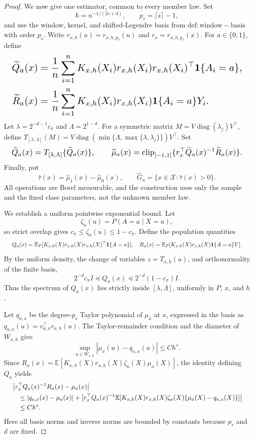 \documentclass{article}
\begin{document}
\begin{proof}
We now give one estimator, common to every member law. Set
\[
h=n^{-1/(2s+d)},\qquad p_s=\lceil s\rceil-1,
\]
and use the window, kernel, and shifted-Legendre basis from \(\mathrm{def:window-basis}\) with order \(p_s\). Write \(r_{x,h}(u)=r_{x,h,p_s}(u)\) and \(r_x=r_{x,h,p_s}(x)\). For \(a\in\{0,1\}\), define
\[
\makebox[\linewidth][c]{\resizebox{0.98\linewidth}{!}{\(\displaystyle \begin{aligned}
\widetilde Q_a(x)&=\frac1n\sum_{i=1}^n K_{x,h}(X_i)r_{x,h}(X_i)r_{x,h}(X_i)^\top\mathbf 1\{A_i=a\},\\
\widetilde R_a(x)&=\frac1n\sum_{i=1}^n K_{x,h}(X_i)r_{x,h}(X_i)\mathbf 1\{A_i=a\}Y_i.
\end{aligned}\)}}
\]
Let \(\lambda=2^{-d-1}c_\pi\) and \(\Lambda=2^{1-d}\). For a symmetric matrix \(M=V\operatorname{diag}(\lambda_j)V^\top\), define \(T_{[\lambda,\Lambda]}(M)=V\operatorname{diag}(\min\{\Lambda,\max\{\lambda,\lambda_j\}\})V^\top\). Set
\[
\makebox[\linewidth][c]{\resizebox{0.98\linewidth}{!}{\(\displaystyle \widehat Q_a(x)=T_{[\lambda,\Lambda]}\{\widetilde Q_a(x)\},
\qquad
\widehat\mu_a(x)=\operatorname{clip}_{[-1,1]}
\{r_x^\top\widehat Q_a(x)^{-1}\widetilde R_a(x)\}.\)}}
\]
Finally, put
\[
\widehat\tau(x)=\widehat\mu_1(x)-\widehat\mu_0(x),
\qquad
\widehat G_n=\{x\in\mathcal X:\widehat\tau(x)>0\}.
\]
All operations are Borel measurable, and the construction uses only the sample and the fixed class parameters, not the unknown member law.

We establish a uniform pointwise exponential bound. Let
\[
\zeta_a(u)=P(A=a\mid X=u),
\]
so strict overlap gives \(c_\pi\le\zeta_a(u)\le1-c_\pi\). Define the population quantities
\[
\makebox[\linewidth][c]{\resizebox{0.98\linewidth}{!}{\(\displaystyle Q_a(x)=\mathbb E_P[K_{x,h}(X)r_{x,h}(X)r_{x,h}(X)^\top\mathbf 1\{A=a\}],
\quad
R_a(x)=\mathbb E_P[K_{x,h}(X)r_{x,h}(X)\mathbf 1\{A=a\}Y].\)}}
\]
By the uniform density, the change of variables \(z=T_{x,h}(u)\), and orthonormality of the finite basis,
\[
2^{-d}c_\pi I\preceq Q_a(x)\preceq2^{-d}(1-c_\pi)I.
\]
Thus the spectrum of \(Q_a(x)\) lies strictly inside \([\lambda,\Lambda]\), uniformly in \(P\), \(x\), and \(h\).

Let \(q_{a,x}\) be the degree-\(p_s\) Taylor polynomial of \(\mu_a\) at \(x\), expressed in the basis as \(q_{a,x}(u)=v_{a,x}^\top r_{x,h}(u)\). The Taylor-remainder condition and the diameter of \(W_{x,h}\) give
\[
\sup_{u\in W_{x,h}}|\mu_a(u)-q_{a,x}(u)|\le C h^s.
\]
Since \(R_a(x)=\mathbb E[K_{x,h}(X)r_{x,h}(X)\zeta_a(X)\mu_a(X)]\), the identity defining \(Q_a\) yields
\[
\makebox[\linewidth][c]{\resizebox{0.98\linewidth}{!}{\(\displaystyle \begin{aligned}
&\left|r_x^\top Q_a(x)^{-1}R_a(x)-\mu_a(x)\right|\\
&\quad\le |q_{a,x}(x)-\mu_a(x)|
+\left|r_x^\top Q_a(x)^{-1}
\mathbb E[K_{x,h}(X)r_{x,h}(X)\zeta_a(X)
\{\mu_a(X)-q_{a,x}(X)\}]\right|\\
&\quad\le C h^s.
\end{aligned}\)}}
\]
Here all basis norms and inverse norms are bounded by constants because \(p_s\) and \(d\) are fixed.


\end{proof}
\end{document}
